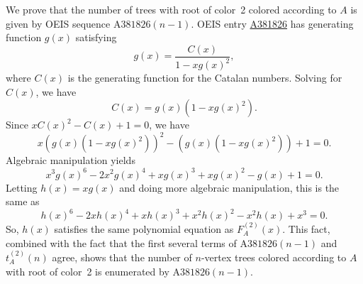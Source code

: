 \documentclass[12pt]{amsart}
\newcommand{\seqnum}[1]{\href{https://oeis.org/#1}{#1}}
\newcommand{\gff}[2]{F_{#2}^{(#1)}(x)}
\newcommand{\gfa}[1]{\gff{#1}{A}}
\begin{document}
\begin{description}
\begin{itemize}
\end{itemize}
    \item[Discussion] 
    We prove that the number of trees with root of color~2 colored according to $A$ is given by OEIS sequence $\text{A381826}(n-1)$.
    OEIS entry \seqnum{A381826} has generating function $g(x)$ satisfying
    \[
    g(x) = \frac{C(x)}{1-xg(x)^2},
    \]
    where $C(x)$ is the generating function for the Catalan numbers. Solving for $C(x)$, we have
    \[
    C(x)=g(x)\left(1-xg(x)^2\right).
    \]
    Since $xC(x)^2-C(x)+1=0$, we have
    \[
    x\left(g(x)\left(1-xg(x)^2\right)\right)^2-\left(g(x)\left(1-xg(x)^2\right)\right)+1=0.
    \]
    Algebraic manipulation yields
    \[
    x^3g(x)^6-2x^2g(x)^4+xg(x)^3+xg(x)^2-g(x)+1=0.
    \]
    Letting $h(x)=xg(x)$ and doing more algebraic manipulation, this is the same as
    \[
    h(x)^6-2xh(x)^4+xh(x)^3+x^2h(x)^2-x^2h(x)+x^3=0.
    \]
    So, $h(x)$ satisfies the same polynomial equation as $\gfa{2}$. This fact, combined with the fact that the first several terms of $\text{A381826}(n-1)$ and $t_A^{(2)}(n)$ agree, shows that the number of $n$-vertex trees colored according to $A$ with root of color~2 is enumerated by $\text{A381826}(n-1)$.
\end{description}
\end{document}
